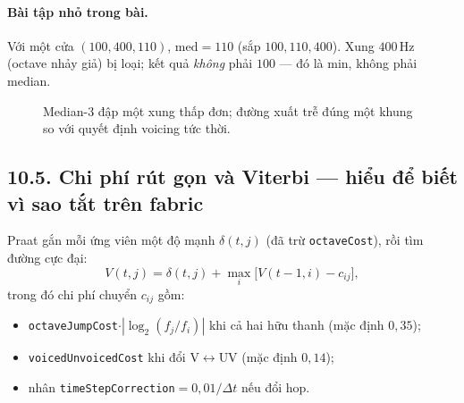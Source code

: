 \paragraph{Bài tập nhỏ trong bài.} Với một cửa $(100,400,110)$, $\mathrm{med}=110$ (sắp $100,110,400$). Xung $400\,\text{Hz}$ (octave nhảy giả) bị loại; kết quả \emph{không} phải $100$ --- đó là min, không phải median.

\begin{figure}[H]
\centering
{}
\caption{Median-3 đập một xung thấp đơn; đường xuất trễ đúng một khung so với quyết định voicing tức thời.}
\label{fig:ch10_median3}
\end{figure}

\subsection*{10.5. Chi phí rút gọn và Viterbi --- hiểu để biết vì sao tắt trên fabric}

Praat gắn mỗi ứng viên một độ mạnh $\delta(t,j)$ (đã trừ \texttt{octaveCost}), rồi tìm đường cực đại:
\begin{equation}
\label{eq:ch10_viterbi}
V(t,j)=\delta(t,j)+\max_i\bigl[V(t-1,i)-c_{ij}\bigr],
\end{equation}
trong đó chi phí chuyển $c_{ij}$ gồm:
\begin{itemize}[leftmargin=1.4em]
    \item \texttt{octaveJumpCost}$\cdot|\log_2(f_j/f_i)|$ khi cả hai hữu thanh (mặc định $0{,}35$);
    \item \texttt{voicedUnvoicedCost} khi đổi V$\leftrightarrow$UV (mặc định $0{,}14$);
    \item nhân \texttt{timeStepCorrection}$=0{,}01/\Delta t$ nếu đổi hop.
\end{itemize}

